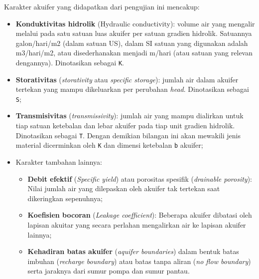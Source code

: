 Karakter akuifer yang didapatkan dari pengujian ini mencakup: 

\begin{itemize}
    \item \textbf{Konduktivitas hidrolik} (Hydraulic conductivity): volume air yang mengalir melalui pada satu satuan luas akuifer per satuan gradien hidrolik. Satuannya galon/hari/m2 (dalam satuan US), dalam SI satuan yang digunakan adalah m3/hari/m2, atau disederhanakan menjadi m/hari (atau satuan yang relevan dengannya). Dinotasikan sebagai \verb|K|.
    \item \textbf{Storativitas} (\textit{storativity} atau \textit{specific storage}): jumlah air dalam akuifer tertekan yang mampu dikeluarkan per perubahan \textit{head}. Dinotasikan sebagai \verb|S|;
    \item \textbf{Transmisivitas} (\textit{transmissivity}): jumlah air yang mampu dialirkan untuk tiap satuan ketebalan dan lebar akuifer pada tiap unit gradien hidrolik. Dinotasikan sebagai \verb|T|. Dengan demikian bilangan ini akan mewakili jenis material dicerminkan oleh \verb|K| dan dimensi ketebalan \verb|b| akuifer;
    \item Karakter tambahan lainnya:
        \begin{itemize}
        \item \textbf{Debit efektif} (\textit{Specific yield}) atau porositas spesifik (\textit{drainable porosity}): Nilai jumlah air yang dilepaskan oleh akuifer tak tertekan saat dikeringkan sepenuhnya;
        \item \textbf{Koefisien bocoran} (\textit{Leakage coefficient}): Beberapa akuifer dibatasi oleh lapisan akuitar yang secara perlahan mengalirkan air ke lapisan akuifer lainnya;
        \item \textbf{Kehadiran batas akuifer} (\textit{aquifer boundaries}) dalam bentuk batas imbuhan (\textit{recharge boundary}) atau batas tanpa aliran (\textit{no flow boundary}) serta jaraknya dari sumur pompa dan sumur pantau.
        \end{itemize}
\end{itemize}

